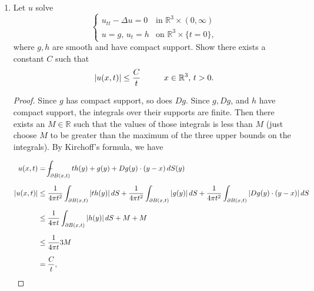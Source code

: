 \documentclass[11pt,oneside,english]{amsart}
\theoremstyle{definition}
\newcommand{\aspace}{\hspace{7mm}\text{and}\hspace{7mm}}
\newcommand{\pspace}{\hspace{10mm}}
\newcommand{\MB}[1]{\mathbb{#1}}
\def\Xint#1{\mathchoice
{\XXint\displaystyle\textstyle{#1}}%
{\XXint\textstyle\scriptstyle{#1}}%
{\XXint\scriptstyle\scriptscriptstyle{#1}}%
{\XXint\scriptscriptstyle\scriptscriptstyle{#1}}%
\!\int}
\def\XXint#1#2#3{{\setbox0=\hbox{$#1{#2#3}{\int}$ }
\vcenter{\hbox{$#2#3$ }}\kern-.6\wd0}}
\def\dashint{\Xint-}
\begin{document}
\begin{enumerate}
\begin{enumerate}
\item Prove $k(t)=p(t)$ for all large enough times $t$.

\begin{proof}
Recall d'Alembert's formula: 
\[
u(x,t)=\frac{1}{2}[g(x+t)+g(x-t)]+\frac{1}{2}_{x-t}^{x+t}h(y)\,dy.
\] 

Differentiating with respect to $t$ and $x$ yields

\[
u_t=\frac{1}{2}[g'(x+t)-g'(x-t)]+\frac{1}{2}[h(x+t)+h(x-t)]=\frac{1}{2}[G(x+t)+H(x-t)]\text{ and}
\]
\[
u_x=\frac{1}{2}[g'(x+t)+g'(x-t)]+\frac{1}{2}[h(x+t)-h(x-t)]=\frac{1}{2}[G(x+t)-H(x-t)]\text{ where}
\]
\[
G(x+t)=h(x+t)-g'(x+t) \aspace H(x-t)=h(x-t)-g'(x-t).
\]

Then
\[
u_t^2=\frac{1}{4}[G^2+2GH+H^2] \aspace u_x^2=\frac{1}{4}[G^2-2GH+H^2]
\]
so
\[
u_t^2-u_x^2=GH.
\]

Now, $g$ and $h$ have compact support, and consequently so do $G$, $H$, and $GH$. Choose $N$ such that $\text{supp}(GH)\subseteq [-N,N]$. Then when $t>N$, 
\[
0=GH=u_t^2-u_x^2.
\]
Thus, for large enough $t$, 

\[
0=\frac{1}{2}\int_{-\infty}^\infty u_t^2-u_x^2\,dx=\frac{1}{2}\int_{-\infty}^\infty u_t^2\,dx-\int_{-\infty}^\infty u_x^2\,dx=k(t)-p(t)
\]

whence $k(t)=p(t)$.
\end{proof}
\end{enumerate}

\pagebreak


\item Let $u$ solve
\[
\begin{cases}u_{tt}-\Delta u=0 & \text{in }\MB{R}^3\times(0,\infty) \\ u=g,\, u_t=h & \text{on }\MB{R}^3\times\{t=0\},\end{cases}
\]
where $g,h$ are smooth and have compact support. Show there exists a constant $C$ such that
\[
|u(x,t)|\leq \frac{C}{t}\pspace x\in\MB{R}^3,\,t>0.
\]

\begin{proof}
Since $g$ has compact support, so does $Dg$. Since $g,Dg$, and $h$ have compact support, the integrals over their supports are finite. Then there exists an $M\in \MB{R}$ such that the values of those integrals is less than $M$ (just choose $M$ to be greater than the maximum of the three upper bounds on the integrals). By Kirchoff's formula, we have

\begin{align*}
u(x,t)&=\dashint_{\partial B(x,t)}th(y)+g(y)+Dg(y)\cdot(y-x) \,dS(y)\\[2mm]
|u(x,t)|&\leq\frac{1}{4\pi t^2}\int_{\partial B(x,t)}|th(y)|\,dS+\frac{1}{4\pi t^2}\int_{\partial B(x,t)}|g(y)|\,dS+\frac{1}{4\pi t^2}\int_{\partial B(x,t)}|Dg(y)\cdot(y-x)|\,dS\\[2mm]
&\leq\frac{1}{4\pi t}\int_{\partial B(x,t)}|h(y)|\,dS+M+M\\[2mm]
&\leq\frac{1}{4\pi t}3M\\[2mm]
&=\frac{C}{t},
\end{align*}


\end{proof}
\end{enumerate}
\end{document}
